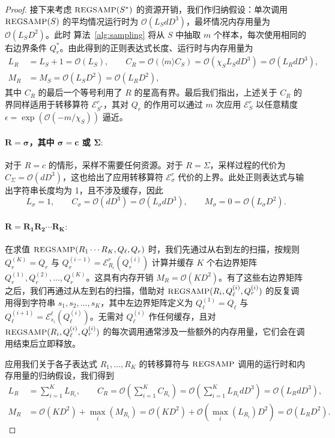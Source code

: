 \documentclass[twoside]{article}
\newcommand{\Sample}{\textsc{\small REGSAMP}}
\newcommand{\bigO}{\mc{O}}
\newcommand{\EL}{\mc{E}^{\scriptstyle \ell}}
\newcommand{\ER}{\mc{E}^{\scriptstyle r}}
\newcommand{\QL}{Q_{\ell}}
\newcommand{\QR}{Q_{r}}
\newcommand{\mc}[1]{\mathcal{#1}}
\begin{document}
\begin{proof}
接下来考虑 $\Sample(S^*)$ 的资源开销，我们作归纳假设：单次调用 $\Sample(S)$ 的平均情况运行时为 $\bigO(L_S d D^3)$，最坏情况内存用量为 $\bigO(L_S D^2)$。此时 算法~\ref{alg:sampling} 
将从 $S$ 中抽取 $m$ 个样本，每次使用相同的右边界条件 $\QR^*$。由此得到的正则表达式长度、运行时与内存用量为
%
\begin{align*}
    L_R &= L_S + 1 = \bigO(L_S), \qquad C_R = \bigO(\langle m \rangle C_S) = \bigO(\chi_S L_S d D^3) = \bigO(L_R d D^3), \\
    M_R &= M_S = \bigO(L_S D^2) = \bigO(L_R D^2),
\end{align*}
%
其中 $C_R$ 的最后一个等号利用了 $R$ 的星高有界。最后我们指出，上述关于 $C_R$ 的界同样适用于转移算符 $\ER_{S^*}$，其对 $\QR$ 的作用可以通过 $m$ 次应用 $\ER_S$ 以任意精度 $\epsilon = \exp(\bigO(-m / \chi_S))$ 逼近。

\paragraph{$\mathbf{R = \sigma}$\textbf{，其中 }$\mathbf{\sigma=c}$\textbf{ 或 }$\mathbf{\Sigma:}$} 对于 $R = c$ 的情形，采样不需要任何资源。对于 $R = \Sigma$，采样过程的代价为 $C_\Sigma = \bigO(d D^3)$，这也给出了应用转移算符 $\ER_\sigma$ 代价的上界。此处正则表达式与输出字符串长度均为 1，且不涉及缓存，因此
%
\begin{equation*}
    L_\sigma = 1, \qquad C_\sigma = \bigO(d D^3) = \bigO(L_\sigma d D^3), \qquad M_\sigma = 0 = \bigO(L_\sigma D^2).
\end{equation*}
%
\paragraph{$\mathbf{R = R_1 R_2 \cdots R_K:}$} 在求值 $\Sample(R_1 \cdots R_K, \QL, \QR)$ 时，我们先通过从右到左的扫描，按规则 $\QR^{(K)} = \QR$ 与 $\QR^{(i-1)} = \ER_{R_i}(\QR^{(i)})$ 计算并缓存 $K$ 个右边界矩阵 $\QR^{(1)}, \QR^{(2)}, \ldots, \QR^{(K)}$。这具有内存开销 $M_R = \bigO(K D^2)$。有了这些右边界矩阵之后，我们再通过从左到右的扫描，借助对 $\Sample(R_i, \QL^{(i)}, \QR^{(i)})$ 的反复调用得到字符串 $s_1, s_2, \ldots, s_K$，其中左边界矩阵定义为 $\QL^{(1)} = \QL$ 与 $\QL^{(i+1)} = \EL_{s_i}(\QL^{(i)})$。无需对 $\QL^{(i)}$ 作任何缓存，且对 $\Sample(R_i, \QL^{(i)}, \QR^{(i)})$ 的每次调用通常涉及一些额外的内存用量，它们会在调用结束后立即释放。 

应用我们关于各子表达式 $R_1, \ldots, R_K$ 的转移算符与 $\Sample$ 调用的运行时和内存用量的归纳假设，我们得到
%
\begin{align*}
    L_R &= \sum_{i=1}^K L_{R_i}, \qquad C_R = \bigO\!\left(\sum_{i=1}^K C_{R_i}\right) = \bigO\!\left(\sum_{i=1}^K L_{R_i} d D^3\right) = \bigO(L_R d D^3), \\
    M_R &= \bigO(K D^2) + \max_{i}(M_{R_i}) = \bigO(K D^2) + \bigO(\max_i(L_{R_i})D^2) = \bigO(L_R D^2).
\end{align*}
%

\end{proof}
\end{document}
